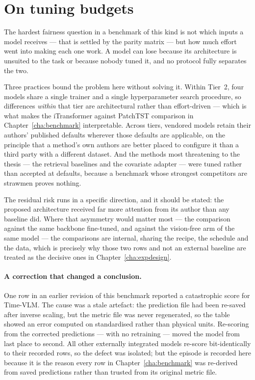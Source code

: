 \section{On tuning budgets}
\label{sec:tuning}

The hardest fairness question in a benchmark of this kind is not which inputs a model
receives --- that is settled by the parity matrix --- but how much effort went into making
each one work. A model can lose because its architecture is unsuited to the task or because
nobody tuned it, and no protocol fully separates the two.

Three practices bound the problem here without solving it. Within Tier~2, four models share a
single trainer and a single hyperparameter search procedure, so differences \emph{within} that
tier are architectural rather than effort-driven --- which is what makes the iTransformer
against PatchTST comparison in Chapter~\ref{cha:benchmark} interpretable. Across tiers,
vendored models retain their authors' published defaults wherever those defaults are
applicable, on the principle that a method's own authors are better placed to configure it
than a third party with a different dataset. And the methods most threatening to the thesis
--- the retrieval baselines and the covariate adapter --- were tuned rather than accepted at
defaults, because a benchmark whose strongest competitors are strawmen proves nothing.

The residual risk runs in a specific direction, and it should be stated: the proposed
architecture received far more attention from its author than any baseline did. Where that
asymmetry would matter most --- the comparison against the same backbone fine-tuned, and
against the vision-free arm of the same model --- the comparisons are internal, sharing the
recipe, the schedule and the data, which is precisely why those two rows and not an external
baseline are treated as the decisive ones in Chapter~\ref{cha:expdesign}.

\paragraph{A correction that changed a conclusion.} One row in an earlier revision of this
benchmark reported a catastrophic score for Time-VLM. The cause was a stale artefact: the
prediction file had been re-saved after inverse scaling, but the metric file was never
regenerated, so the table showed an error computed on standardised rather than physical
units. Re-scoring from the corrected predictions --- with no retraining --- moved the model
from last place to second. All other externally integrated models re-score bit-identically to
their recorded rows, so the defect was isolated; but the episode is recorded here because it
is the reason every row in Chapter~\ref{cha:benchmark} was re-derived from saved predictions
rather than trusted from its original metric file.

\par

